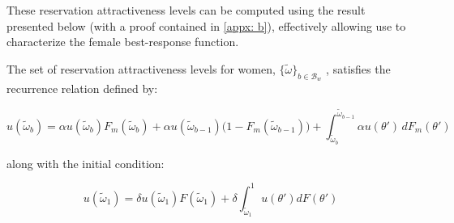 These reservation attractiveness levels can be computed using the result presented below (with a proof contained in \ref{appx: b}), effectively allowing use to characterize the female best-response function.

\begin{proposition}
The set of reservation attractiveness levels for women, $\{\tilde\omega\}_{b\in \mathcal{B}_w}$ , satisfies the recurrence relation defined by: 

\begin{equation*}
    u(\widetilde \omega_b) = \alpha u(\widetilde \omega_b) F_m(\widetilde \omega_b) + \alpha u(\widetilde \omega_{b-1})\Big(1- F_m(\widetilde \omega_{b-1})\Big)+\int^{\widetilde \omega_{b-1}}_{\widetilde \omega_b} \alpha u(\theta')\,dF_m(\theta')
\end{equation*}

along with the initial condition:

\begin{equation*}
    u(\widetilde\omega_1) =\delta u(\widetilde\omega_1)F(\widetilde\omega_1) + \delta \int^1_{\widetilde\omega_1}u(\theta')dF(\theta')
\end{equation*}
\end{proposition}


\begin{comment}

\begin{itemize}
    \item Present case for women, then say case for men follows
    \item Condition on male strategy and steady state
    \item Present Ex-interim utility maximization
    \begin{itemize}
        \item Show it reduces to a constant
    \end{itemize} 
    \item Present sequence problem
    \item Derive Bellman equation
    \item Prove uniqueness of value function and solution
    \item Derive solution
\end{itemize}
\end{comment}